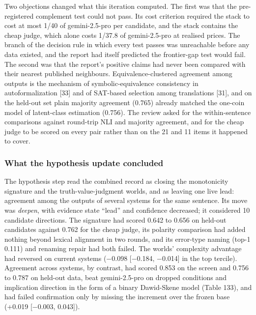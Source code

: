 \documentclass[11pt,letterpaper]{article}
\begin{document}
Two objections changed what this iteration computed. The first was that the pre-registered complement test could not pass. Its cost criterion required the stack to cost at most 1/40 of gemini-2.5-pro per candidate, and the stack contains the cheap judge, which alone costs 1/37.8 of gemini-2.5-pro at realised prices. The branch of the decision rule in which every test passes was unreachable before any data existed, and the report had itself predicted the frontier-gap test would fail. The second was that the report's positive claims had never been compared with their nearest published neighbours. Equivalence-clustered agreement among outputs is the mechanism of symbolic-equivalence consistency in autoformalization [33] and of SAT-based selection among translations [31], and on the held-out set plain majority agreement (0.765) already matched the one-coin model of latent-class estimation (0.756). The review asked for the within-sentence comparisons against round-trip NLI and majority agreement, and for the cheap judge to be scored on every pair rather than on the 21 and 11 items it happened to cover.

\subsubsection{What the hypothesis update concluded}

The hypothesis step read the combined record as closing the monotonicity signature and the truth-value-judgment worlds, and as leaving one live lead: agreement among the outputs of several systems for the same sentence. Its move was \emph{deepen}, with evidence state ``lead'' and confidence decreased; it considered 10 candidate directions. The signature had scored 0.642 to 0.656 on held-out candidates against 0.762 for the cheap judge, its polarity comparison had added nothing beyond lexical alignment in two rounds, and its error-type naming (top-1 0.111) and renaming repair had both failed. The worlds' complexity advantage had reversed on current systems ($-$0.098 [$-$0.184, $-$0.014] in the top tercile). Agreement across systems, by contrast, had scored 0.853 on the screen and 0.756 to 0.787 on held-out data, beat gemini-2.5-pro on dropped conditions and implication direction in the form of a binary Dawid-Skene model (Table 133), and had failed confirmation only by missing the increment over the frozen base (+0.019 [$-$0.003, 0.043]).
\end{document}
